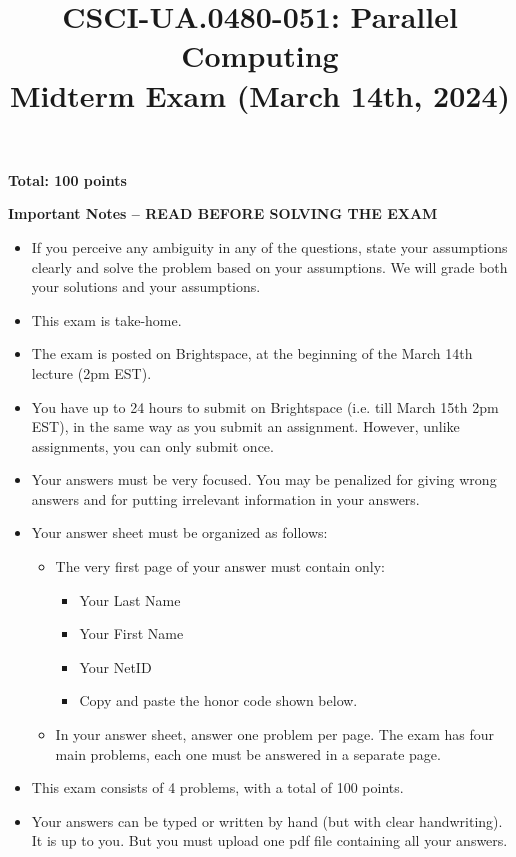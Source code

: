\documentclass{article}
\title{CSCI-UA.0480-051: Parallel Computing \\ Midterm Exam (March 14th, 2024)}
\author{}
\date{}
\begin{document}
\maketitle

\textbf{Total: 100 points}

\textbf{Important Notes -- READ BEFORE SOLVING THE EXAM}

\begin{itemize}
    \item If you perceive any ambiguity in any of the questions, state your assumptions clearly and solve the problem based on your assumptions. We will grade both your solutions and your assumptions.
    \item This exam is take-home.
    \item The exam is posted on Brightspace, at the beginning of the March 14th lecture (2pm EST).
    \item You have up to 24 hours to submit on Brightspace (i.e. till March 15th 2pm EST), in the same way as you submit an assignment. However, unlike assignments, you can only submit once.
    \item Your answers must be very focused. You may be penalized for giving wrong answers and for putting irrelevant information in your answers.
    \item Your answer sheet must be organized as follows:
    \begin{itemize}
        \item The very first page of your answer must contain only:
        \begin{itemize}
            \item Your Last Name
            \item Your First Name
            \item Your NetID
            \item Copy and paste the honor code shown below.
        \end{itemize}
        \item In your answer sheet, answer one problem per page. The exam has four main problems, each one must be answered in a separate page.
    \end{itemize}
    \item This exam consists of 4 problems, with a total of 100 points.
    \item Your answers can be typed or written by hand (but with clear handwriting). It is up to you. But you must upload one pdf file containing all your answers.
\end{itemize}
\end{document}
